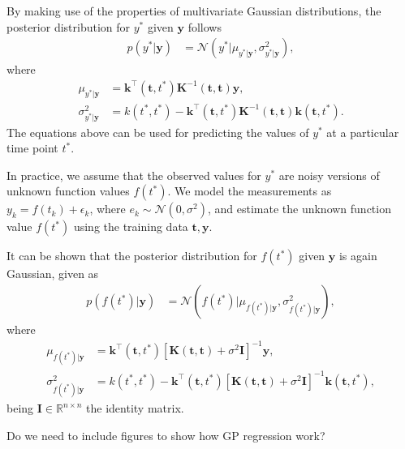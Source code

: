 \documentclass[journal]{IEEEtran}
\newcommand{\mauricio}[1]{{\color{blue}#1}}
\newcommand{\simo}[1]{{\color{red}#1}}
\begin{document}
By making use of the properties of multivariate Gaussian distributions, the posterior distribution for $y^*$ given
$\mathbf{y}$ follows
\begin{align*}
p(y^*|\mathbf{y}) & =\mathcal{N}(y^*|\mu_{y^*|\mathbf{y}}, \sigma^2_{y^*|\mathbf{y}}),
\end{align*}
where
\begin{align*}
\mu_{y^*|\mathbf{y}} & = \mathbf{k}^{\top}(\mathbf{t}, t^*)\mathbf{K}^{-1}(\mathbf{t}, \mathbf{t})\mathbf{y},\\
\sigma^2_{y^*|\mathbf{y}} & = k(t^*, t^*) - \mathbf{k}^{\top}(\mathbf{t}, t^*)\mathbf{K}^{-1}(\mathbf{t}, \mathbf{t})
\mathbf{k}(\mathbf{t}, t^*).
\end{align*}
The equations above can be used for predicting the values of $y^*$ at a particular time point $t^*$.

In practice, we assume that the observed values for $y^*$ are noisy versions of unknown function values $f(t^*)$.
We model the measurements as $y_k = f(t_k) + \epsilon_k$, where $e_k\sim \mathcal{N}(0, \sigma^2)$, and estimate
the unknown function value $f(t^*)$ using the training data $\mathbf{t}, \mathbf{y}$.

It can be shown that the posterior distribution for $f(t^*)$ given $\mathbf{y}$ is again Gaussian, given as
\begin{align*}
p(f(t^*)|\mathbf{y}) & =\mathcal{N}(f(t^*)|\mu_{f(t^*)|\mathbf{y}}, \sigma^2_{f(t^*)|\mathbf{y}}),
\end{align*}
where
\begin{align*}
\mu_{f(t^*)|\mathbf{y}} & = \mathbf{k}^{\top}(\mathbf{t}, t^*)\left[\mathbf{K}(\mathbf{t}, \mathbf{t}) +
\sigma^2\mathbf{I}\right]^{-1}\mathbf{y},\\
\sigma^2_{f(t^*)|\mathbf{y}} & = k(t^*, t^*) - \mathbf{k}^{\top}(\mathbf{t}, t^*)\left[\mathbf{K}(\mathbf{t}, \mathbf{t}) +
\sigma^2\mathbf{I}\right]^{-1}\mathbf{k}(\mathbf{t}, t^*),
\end{align*}
being $\mathbf{I}\in\mathbb{R}^{n\times n}$ the identity matrix.

\mauricio{Do we need to include figures to show how GP regression work?}


\end{document}

